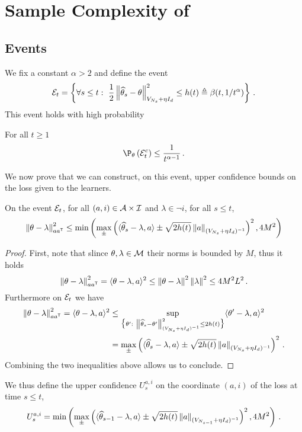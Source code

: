 \section{Sample Complexity of \LG{}}\label{app:lgc.proof_nc}

\subsection{Events}\label{app:lgc.proof_nc.events}
We fix a constant $\alpha>2$ and define the event
\[
\mathcal{E}_t = \left\{\forall s \leq  t:\ \frac{1}{2}\left\lVert\widehat{\theta}_s-\theta\right\rVert^2_{V_{N_s}+\eta I_d} \leq h(t)\triangleq \beta(t,1/t^\alpha)\right\}\,.
\]
This event holds with high probability
\begin{lemma}
\label{lem:prb_Et_nc}
For all $t \geq 1$
\[
\P_\theta\left(\cE_t^c\right)\leq \frac{1}{t^{\alpha-1}}\,.
\]
\end{lemma}
We now prove that we can construct, on this event, upper confidence bounds on the loss given to the learners.
\begin{lemma}
\label{lem:confidence_bound_general_nc}
On the event $\mathcal{E}_t$, for all $(a,i)\in\mathcal{A}\times\mathcal{I}$ and $\lambda\in\neg i$, for all $s\leq t$,
\[
\left\lVert\theta-\lambda\right\rVert^2_{aa^{\mathsf{\scriptscriptstyle T}}} \leq \min\left(\max_\pm \left( \langle \widehat{\theta}_{s} - \lambda,a\rangle \pm \sqrt{2 h(t)} \left\lVert a\right\rVert_{(V_{N_s}+ \eta I_d)^{-1}} \right)^2,4M^2\right)
\]
\end{lemma}
\begin{proof}
First, note that slince $\theta,\lambda\in\mathcal{M}$ their norms is bounded by $M$, thus it holds
\[
\left\lVert\theta-\lambda\right\rVert^2_{aa^{\mathsf{\scriptscriptstyle T}}} = \langle\theta-\lambda,a \rangle^2 \leq \left\lVert\theta-\lambda\right\rVert^2 \left\lVert\lambda\right\rVert^2 \leq 4M^2L^2\,.
\]
Furthermore on $\mathcal{E}_t$ we have
\begin{align*}
\left\lVert\theta-\lambda\right\rVert^2_{aa^{\mathsf{\scriptscriptstyle T}}} = \langle\theta-\lambda,a \rangle^2 &\leq \sup_{\big\{\theta':\ \left\lVert\widehat{\theta}_s-\theta'\right\rVert^2_{(V_{N_s} + \eta I_d)^{-1} } \leq 2h(t)\big\}} \langle\theta'-\lambda,a \rangle^2\\
&=\max_\pm \left( \langle \widehat{\theta}_{s} - \lambda,a\rangle \pm \sqrt{2 h(t)} \left\lVert a\right\rVert_{(V_{N_s}+ \eta I_d)^{-1}} \right)^2\,.
\end{align*}
Combining the two inequalities above allows us to conclude.
\end{proof}
We thus define the upper confidence $U_s^{a,i}$ on the coordinate $(a,i)$ of the loss at time $s\leq t$,
\begin{equation}
\label{eq:def_ucb_br_general_nc}
U_s^{a,i} = \min\left(\max_\pm \left( \langle \widehat{\theta}_{s-1} - \lambda,a\rangle \pm \sqrt{2 h(t)} \left\lVert a\right\rVert_{(V_{N_{s-1}}+ \eta I_d)^{-1}} \right)^2,4M^2\right)\,.
\end{equation}
